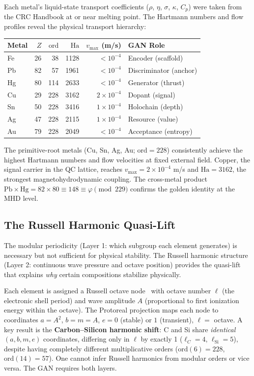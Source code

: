 \noindent Each metal's liquid-state transport coefficients ($\rho$, $\eta$, $\sigma$, $\kappa$, $C_p$) were taken from the CRC Handbook at or near melting point. The Hartmann numbers and flow profiles reveal the physical transport hierarchy:

\begin{center}
{\small
\begin{tabular}{@{}lrrrrl@{}}
\toprule
\textbf{Metal} & $Z$ & $\mathrm{ord}$ & $\mathrm{Ha}$ & $v_{\max}$ (m/s) & \textbf{GAN Role} \\
\midrule
Fe & 26  & 38  & 1128 & $< 10^{-4}$ & Encoder (scaffold) \\
Pb & 82  & 57  & 1961 & $< 10^{-4}$ & Discriminator (anchor) \\
Hg & 80  & 114 & 2633 & $< 10^{-4}$ & Generator (thrust) \\
Cu & 29  & 228 & 3162 & $2 \times 10^{-4}$ & Dopant (signal) \\
Sn & 50  & 228 & 3416 & $1 \times 10^{-4}$ & Holochain (depth) \\
Ag & 47  & 228 & 2115 & $1 \times 10^{-4}$ & Resource (value) \\
Au & 79  & 228 & 2049 & $< 10^{-4}$ & Acceptance (entropy) \\
\bottomrule
\end{tabular}
}
\end{center}

\noindent The primitive-root metals (Cu, Sn, Ag, Au; $\mathrm{ord} = 228$) consistently achieve the highest Hartmann numbers and flow velocities at fixed external field. Copper, the signal carrier in the QC lattice, reaches $v_{\max} = 2 \times 10^{-4}$ m/s and $\mathrm{Ha} = 3162$, the strongest magnetohydrodynamic coupling. The cross-metal product $\mathrm{Pb} \times \mathrm{Hg} = 82 \times 80 \equiv 148 \equiv \varphi \pmod{229}$ confirms the golden identity at the MHD level.

\subsection{The Russell Harmonic Quasi-Lift}\label{sec:quasilift}

The modular periodicity (Layer 1: which subgroup each element generates) is necessary but not sufficient for physical stability. The Russell harmonic structure (Layer 2: continuous wave pressure and octave position) provides the quasi-lift that explains \emph{why} certain compositions stabilize physically.

Each element is assigned a Russell octave node~\cite{Russell1926} with octave number $\ell$ (the electronic shell period) and wave amplitude $A$ (proportional to first ionization energy within the octave). The Protoreal projection maps each node to coordinates $a = A^2$, $b = m = A$, $e = 0$ (stable) or $1$ (transient), $\ell = $ octave. A key result is the \textbf{Carbon--Silicon harmonic shift}: C and Si share \emph{identical} $(a, b, m, e)$ coordinates, differing only in $\ell$ by exactly 1 ($\ell_C = 4$, $\ell_{\mathrm{Si}} = 5$), despite having completely different multiplicative orders ($\mathrm{ord}(6) = 228$, $\mathrm{ord}(14) = 57$). One cannot infer Russell harmonics from modular orders or vice versa. The GAN requires both layers.

